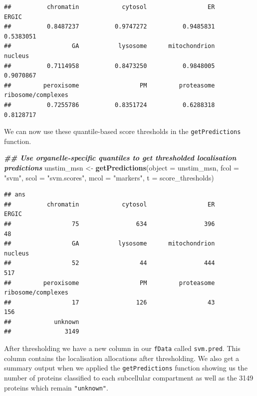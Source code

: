 \documentclass[9pt,a4paper,]{extarticle}
\newenvironment{Shaded}{\begin{snugshade}}{\end{snugshade}}
\newcommand{\AttributeTok}[1]{\textcolor[rgb]{0.13,0.29,0.53}{#1}}
\newcommand{\DocumentationTok}[1]{\textcolor[rgb]{0.56,0.35,0.01}{\textbf{\textit{#1}}}}
\newcommand{\FunctionTok}[1]{\textcolor[rgb]{0.13,0.29,0.53}{\textbf{#1}}}
\newcommand{\NormalTok}[1]{#1}
\newcommand{\OtherTok}[1]{\textcolor[rgb]{0.56,0.35,0.01}{#1}}
\newcommand{\StringTok}[1]{\textcolor[rgb]{0.31,0.60,0.02}{#1}}
\begin{document}
\begin{verbatim}
##          chromatin            cytosol                 ER              ERGIC 
##          0.8487237          0.9747272          0.9485831          0.5383051 
##                 GA           lysosome      mitochondrion            nucleus 
##          0.7114958          0.8473250          0.9848005          0.9070867 
##         peroxisome                 PM         proteasome ribosome/complexes 
##          0.7255786          0.8351724          0.6288318          0.8128717
\end{verbatim}

We can now use these quantile-based score thresholds in the \texttt{getPredictions}
function.

\begin{Shaded}
\begin{Highlighting}[]
\DocumentationTok{\#\# Use organelle{-}specific quantiles to get thresholded localisation predictions}
\NormalTok{unstim\_msn }\OtherTok{\textless{}{-}} \FunctionTok{getPredictions}\NormalTok{(}\AttributeTok{object =}\NormalTok{ unstim\_msn, }
                             \AttributeTok{fcol =} \StringTok{"svm"}\NormalTok{,}
                             \AttributeTok{scol =} \StringTok{"svm.scores"}\NormalTok{,}
                             \AttributeTok{mcol =} \StringTok{"markers"}\NormalTok{,}
                             \AttributeTok{t =}\NormalTok{ score\_thresholds)}
\end{Highlighting}
\end{Shaded}

\begin{verbatim}
## ans
##          chromatin            cytosol                 ER              ERGIC 
##                 75                634                396                 48 
##                 GA           lysosome      mitochondrion            nucleus 
##                 52                 44                444                517 
##         peroxisome                 PM         proteasome ribosome/complexes 
##                 17                126                 43                156 
##            unknown 
##               3149
\end{verbatim}

After thresholding we have a new column in our \texttt{fData} called \texttt{svm.pred}. This
column contains the localisation allocations after thresholding. We also get
a summary output when we applied the \texttt{getPredictions} function showing us the
number of proteins classified to each subcellular compartment as well as the
3149 proteins which remain
\texttt{"unknown"}.
\end{document}
